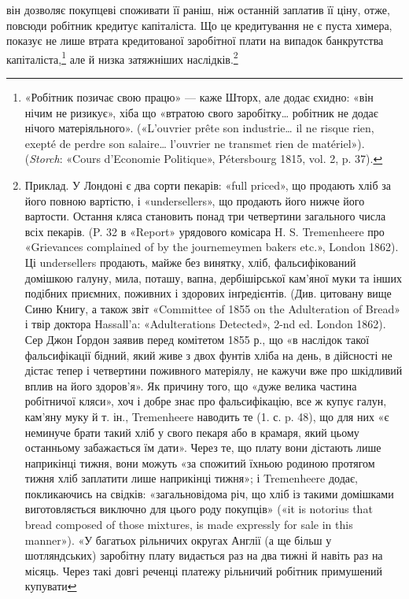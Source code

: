 \parcont{}  %
він дозволяє покупцеві споживати її раніш, ніж останній заплатив
її ціну, отже, повсюди робітник кредитує капіталіста. Що це
кредитування не є пуста химера, показує не лише втрата кредитованої
заробітної плати на випадок банкрутства капіталіста,\footnote{
«Робітник позичає свою працю» — каже Шторх, але додає єхидно:
«він нічим не ризикує», хіба що «втратою свого заробітку\dots{} робітник не
додає нічого матеріяльного». («L’ouvrier prête son industrie\dots{} il ne risque
rien, exepté de perdre son salaire\dots{} l’ouvrier ne transmet rien de matériel»).
(\emph{Storch}: «Cours d’Economie Politique», Pétersbourg 1815, vol. 2, p. 37).
}
але й низка затяжніших наслідків.\footnote{
Приклад. У Лондоні є два сорти пекарів: «full priced», що продають
хліб за його повною вартістю, і «undersellers», що продають його
нижче його вартости. Остання кляса становить понад три четвертини
загального числа всіх пекарів. (P. 32 в «Report» урядового комісара
H. S. Tremenheere про «Grievances complained of by the journemeymen
bakers etc.», London 1862). Ці undersellers продають, майже без винятку,
хліб, фальсифікований домішкою галуну, мила, поташу, вапна, дербішірської
кам’яної муки та інших подібних приємних, поживних і здорових
інґредієнтів. (Див. цитовану вище Синю Книгу, а також звіт «Committee
of 1855 on the Adulteration of Bread» і твір доктора Hassall’a: «Adulterations
Detected», 2-nd ed. London 1862). Сер Джон Ґордон заявив
перед комітетом 1855 р., що «в наслідок такої фальсифікації бідний, який
живе з двох фунтів хліба на день, в дійсності не дістає тепер і четвертини
поживного матеріялу, не кажучи вже про шкідливий вплив на його здоров’я».
Як причину того, що «дуже велика частина робітничої кляси»,
хоч і добре знає про фальсифікацію, все ж купує галун, кам’яну муку
й т. ін., Tremenheere наводить те (1. с. p. 48), що для них «є неминуче
брати такий хліб у свого пекаря або в крамаря, який цьому останньому
забажається їм дати». Через те, що плату вони дістають лише наприкінці
тижня, вони можуть «за спожитий їхньою родиною протягом
тижня хліб заплатити лише наприкінці тижня»; і Tremenheere додає,
покликаючись на свідків: «загальновідома річ, що хліб із такими домішками
виготовляється виключно для цього роду покупців» («it is notorius
that bread composed of those mixtures, is made expressly for sale in this
manner»). «У багатьох рільничих округах Англії (а ще більш у шотляндських)
заробітну плату видається раз на два тижні й навіть раз на місяць.
Через такі довгі реченці платежу рільничий робітник примушений купувати
}
